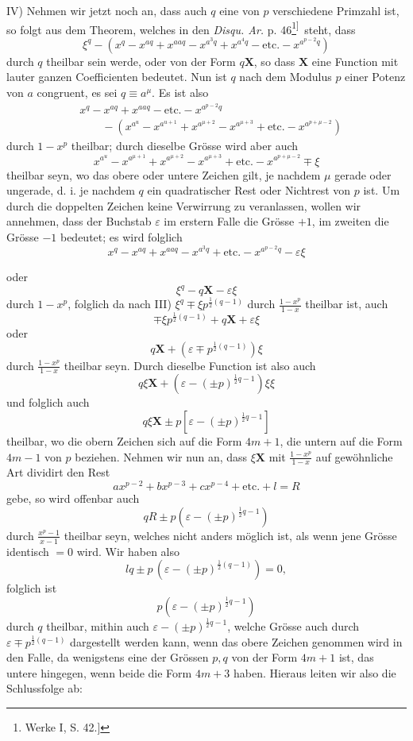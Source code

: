 IV) Nehmen wir jetzt noch an, dass auch $q$ eine von $p$ verschiedene Primzahl ist, so folgt aus dem Theorem, welches in den \textit{Disqu. Ar.} p. 46\begingroup\renewcommand{\thefootnote}{[*)}\footnote{Werke I, S. 42.]}\textsuperscript{]}\endgroup\ steht, dass
\[
\xi^q-(x^q-x^{aq}+x^{aaq}-x^{a^3q}+x^{a^4q}-\text{etc.}-x^{a^{p-2}q})
\]
\noindent durch $q$ theilbar sein werde, oder von der Form $q\mathbf X$, so dass $\mathbf X$ eine Function mit lauter ganzen Coefficienten bedeutet. Nun ist $q$ nach dem Modulus $p$ einer Potenz von $a$ congruent, es sei $q\equiv a^\mu$. Es ist also
\begingroup\small
\[
\begin{aligned}
&x^q-x^{aq}+x^{aaq}-\text{etc.}-x^{a^{p-2}q}\\
&\qquad-(x^{a^u}-x^{a^{u+1}}+x^{a^{\mu+2}}-x^{a^{\mu+3}}+\text{etc.}-x^{a^{p+\mu-2}})
\end{aligned}
\]
\endgroup
\noindent durch $1-x^p$ theilbar; durch dieselbe Grösse wird aber auch
\[
x^{a^u}-x^{a^{\mu+1}}+x^{a^{\mu+2}}-x^{a^{\mu+3}}+\text{etc.}-x^{a^{p+\mu-2}}\mp\xi
\]
\noindent theilbar seyn, wo das obere oder untere Zeichen gilt, je nachdem $\mu$ gerade oder ungerade, d. i. je nachdem $q$ ein quadratischer Rest oder Nichtrest von $p$ ist. Um durch die doppelten Zeichen keine Verwirrung zu veranlassen, wollen wir annehmen, dass der Buchstab $\varepsilon$ im erstern Falle die Grösse $+1$, im zweiten die Grösse $-1$ bedeutet; es wird folglich
\[
x^q-x^{aq}+x^{aaq}-x^{a^3q}+\text{etc.}-x^{a^{p-2}q}-\varepsilon\xi
\]
\clearpage

\noindent oder
\[
\xi^q-q\mathbf X-\varepsilon\xi
\]
\noindent durch $1-x^p$, folglich da nach III) $\xi^q\mp\xi p^{\frac12(q-1)}$ durch $\frac{1-x^p}{1-x}$ theilbar ist, auch
\[
\mp\xi p^{\frac12(q-1)}+q\mathbf X+\varepsilon\xi
\]
\noindent oder
\[
q\mathbf X+(\varepsilon\mp p^{\frac12(q-1)})\xi
\]
\noindent durch $\frac{1-x^p}{1-x}$ theilbar seyn. Durch dieselbe Function ist also auch
\[
q\xi\mathbf X+(\varepsilon-(\pm p)^{\frac12q-1})\xi\xi
\]
\noindent und folglich auch
\[
q\xi\mathbf X\pm p[\varepsilon-(\pm p)^{\frac12q-1}]
\]
\noindent theilbar, wo die obern Zeichen sich auf die Form $4m+1$, die untern auf die Form $4m-1$ von $p$ beziehen. Nehmen wir nun an, dass $\xi\mathbf X$ mit $\frac{1-x^p}{1-x}$ auf gewöhnliche Art dividirt den Rest
\[
ax^{p-2}+bx^{p-3}+cx^{p-4}+\text{etc.}+l=R
\]
\noindent gebe, so wird offenbar auch
\[
qR\pm p(\varepsilon-(\pm p)^{\frac12q-1})
\]
\noindent durch $\frac{x^p-1}{x-1}$ theilbar seyn, welches nicht anders möglich ist, als wenn jene Grösse identisch $=0$ wird. Wir haben also
\[
lq\pm p\,(\varepsilon-(\pm p)^{\frac12(q-1)})=0,
\]
\noindent folglich ist
\[
p(\varepsilon-(\pm p)^{\frac12q-1})
\]
\noindent durch $q$ theilbar, mithin auch $\varepsilon-(\pm p)^{\frac12q-1}$, welche Grösse auch durch $\varepsilon\mp p^{\frac12(q-1)}$ dargestellt werden kann, wenn das obere Zeichen genommen wird in den Falle, da wenigstens eine der Grössen $p,q$ von der Form $4m+1$ ist, das untere hingegen, wenn beide die Form $4m+3$ haben. Hieraus leiten wir also die Schlussfolge ab:
\clearpage

